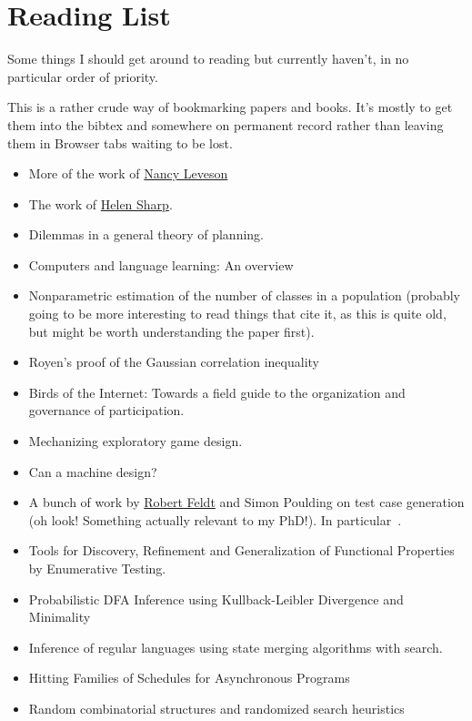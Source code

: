 \chapter{Reading List}

Some things I should get around to reading but currently haven't,
in no particular order of priority.

This is a rather crude way of bookmarking papers and books.
It's mostly to get them into the bibtex and somewhere on permanent record rather than leaving them in Browser tabs waiting to be lost.


\begin{itemize}
\item More of the work of \href{http://sunnyday.mit.edu/papers.html}{Nancy Leveson}
\item The work of \href{http://mcs.open.ac.uk/hcs2/}{Helen Sharp}.
\item Dilemmas in a general theory of planning\cite{rittel1973dilemmas}.
\item Computers and language learning: An overview\cite{warschauer1998computers}
\item Nonparametric estimation of the number of classes in a population\cite{chao1984nonparametric} (probably going to be more interesting to read things that cite it, as this is quite old, but might be worth understanding the paper first).
\item Royen’s proof of the Gaussian correlation inequality\cite{latala2017royen}
\item Birds of the Internet: Towards a field guide to the organization and governance of participation\cite{fish2011birds}.
\item Mechanizing exploratory game design\cite{smith2012mechanizing}.
\item Can a machine design?\cite{cross2001can}
\item A bunch of work by \href{http://www.robertfeldt.net/}{Robert Feldt} and Simon Poulding on test case generation
(oh look! Something actually relevant to my PhD!).
In particular~\cite{DBLP:conf/icst/PouldingF15, DBLP:conf/issre/FeldtP13, DBLP:conf/icse/FeldtP15}.
\item Tools for Discovery, Refinement and Generalization of Functional Properties by Enumerative Testing\cite{matela2017tools}.
\item Probabilistic DFA Inference using Kullback-Leibler Divergence and Minimality\cite{DBLP:conf/icml/ThollardDH00}
\item Inference of regular languages using state merging algorithms with search\cite{DBLP:journals/pr/BugalhoO05}.
\item Hitting Families of Schedules for Asynchronous Programs\cite{DBLP:conf/cav/ChistikovMN16}
\item Random combinatorial structures and randomized search heuristics\cite{DBLP:phd/de/Johannsen2010}
\end{itemize}

